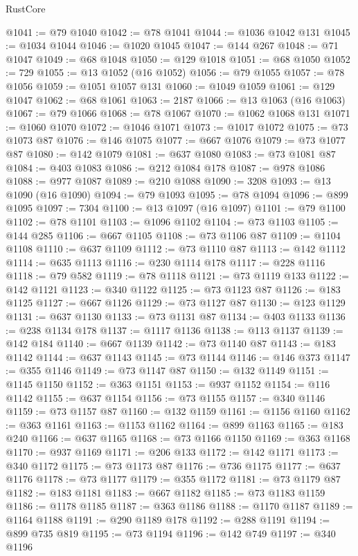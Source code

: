 \begin{lexlean}{RustCore}
\begin{coremodule}
@1041 := @79 @1040
@1042 := @78 @1041
@1044 := @1036 @1042 @131
@1045 := @1034 @1044
@1046 := @1020 @1045
@1047 := @144 @267
@1048 := @71 @1047
@1049 := @68 @1048
@1050 := @129 @1018
@1051 := @68 @1050
@1052 := 729
@1055 := @13 @1052 (@16 @1052)
@1056 := @79 @1055
@1057 := @78 @1056
@1059 := @1051 @1057 @131
@1060 := @1049 @1059
@1061 := @129 @1047
@1062 := @68 @1061
@1063 := 2187
@1066 := @13 @1063 (@16 @1063)
@1067 := @79 @1066
@1068 := @78 @1067
@1070 := @1062 @1068 @131
@1071 := @1060 @1070
@1072 := @1046 @1071
@1073 := @1017 @1072
@1075 := @73 @1073 @87
@1076 := @146 @1075
@1077 := @667 @1076
@1079 := @73 @1077 @87
@1080 := @142 @1079
@1081 := @637 @1080
@1083 := @73 @1081 @87
@1084 := @403 @1083
@1086 := @212 @1084 @178
@1087 := @978 @1086
@1088 := @977 @1087
@1089 := @210 @1088
@1090 := 3208
@1093 := @13 @1090 (@16 @1090)
@1094 := @79 @1093
@1095 := @78 @1094
@1096 := @899 @1095
@1097 := 7304
@1100 := @13 @1097 (@16 @1097)
@1101 := @79 @1100
@1102 := @78 @1101
@1103 := @1096 @1102
@1104 := @73 @1103
@1105 := @144 @285
@1106 := @667 @1105
@1108 := @73 @1106 @87
@1109 := @1104 @1108
@1110 := @637 @1109
@1112 := @73 @1110 @87
@1113 := @142 @1112
@1114 := @635 @1113
@1116 := @230 @1114 @178
@1117 := @228 @1116
@1118 := @79 @582
@1119 := @78 @1118
@1121 := @73 @1119 @133
@1122 := @142 @1121
@1123 := @340 @1122
@1125 := @73 @1123 @87
@1126 := @183 @1125
@1127 := @667 @1126
@1129 := @73 @1127 @87
@1130 := @123 @1129
@1131 := @637 @1130
@1133 := @73 @1131 @87
@1134 := @403 @1133
@1136 := @238 @1134 @178
@1137 := @1117 @1136
@1138 := @113 @1137
@1139 := @142 @184
@1140 := @667 @1139
@1142 := @73 @1140 @87
@1143 := @183 @1142
@1144 := @637 @1143
@1145 := @73 @1144
@1146 := @146 @373
@1147 := @355 @1146
@1149 := @73 @1147 @87
@1150 := @132 @1149
@1151 := @1145 @1150
@1152 := @363 @1151
@1153 := @937 @1152
@1154 := @116 @1142
@1155 := @637 @1154
@1156 := @73 @1155
@1157 := @340 @1146
@1159 := @73 @1157 @87
@1160 := @132 @1159
@1161 := @1156 @1160
@1162 := @363 @1161
@1163 := @1153 @1162
@1164 := @899 @1163
@1165 := @183 @240
@1166 := @637 @1165
@1168 := @73 @1166 @1150
@1169 := @363 @1168
@1170 := @937 @1169
@1171 := @206 @133
@1172 := @142 @1171
@1173 := @340 @1172
@1175 := @73 @1173 @87
@1176 := @736 @1175
@1177 := @637 @1176
@1178 := @73 @1177
@1179 := @355 @1172
@1181 := @73 @1179 @87
@1182 := @183 @1181
@1183 := @667 @1182
@1185 := @73 @1183 @1159
@1186 := @1178 @1185
@1187 := @363 @1186
@1188 := @1170 @1187
@1189 := @1164 @1188
@1191 := @290 @1189 @178
@1192 := @288 @1191
@1194 := @899 @735 @819
@1195 := @73 @1194
@1196 := @142 @749
@1197 := @340 @1196

\end{coremodule}
\end{lexlean}
